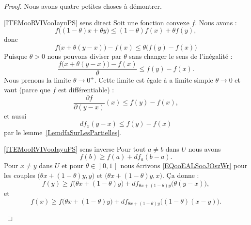 \begin{proof}
    Nous avons quatre petites choses à démontrer.
    \begin{subproof}
    \item[\ref{ITEMooRVIVooIayuPS} sens direct]
        Soit une fonction convexe \( f\). Nous avons :
        \begin{equation}
            f\big( (1-\theta)x+\theta y \big)\leq (1-\theta)f(x)+\theta f(y),
        \end{equation}
        donc
        \begin{equation}
            f\big( x+\theta(y-x) \big)-f(x)\leq \theta\big( f(y)-f(x) \big)
        \end{equation}
        Puisque \( \theta>0\) nous pouvons diviser par \( \theta\) sans changer le sens de l'inégalité :
        \begin{equation}        \label{EQooAXXFooHWtiJh}
            \frac{ f\big( x+\theta(y-x) \big)-f(x) }{ \theta }\leq f(y)-f(x).
        \end{equation}
        Nous prenons la limite \( \theta\to 0^+\). Cette limite est égale à a limite simple \( \theta\to 0\) et vaut (parce que \( f\) est différentiable) :
        \begin{equation}
            \frac{ \partial f }{ \partial (y-x) }(x)\leq f(y)-f(x),
        \end{equation}
        et aussi
        \begin{equation}
            df_x(y-x)\leq f(y)-f(x)
        \end{equation}
        par le lemme~\ref{LemdfaSurLesPartielles}.
    \item[\ref{ITEMooRVIVooIayuPS} sens inverse]
        Pour tout \( a\neq b\) dans \( U\) nous avons
        \begin{equation}        \label{EQooEALSooJOszWr}
            f(b)\geq f(a)+df_a(b-a).
        \end{equation}
        Pour \( x\neq y\) dans \( U\) et pour \( \theta\in\mathopen] 0 , 1 \mathclose[\) nous écrivons \eqref{EQooEALSooJOszWr} pour les couples \( \big( \theta x+(1-\theta)y,y \big)\) et \( \big( \theta x+(1-\theta)y,x \big)\). Ça donne :
        \begin{equation}
            f(y)\geq f\big( \theta x+(1-\theta)y \big)+df_{\theta x+(1-\theta)y}\big( \theta(y-x) \big),
        \end{equation}
        et
        \begin{equation}
            f(x)\geq f\big( \theta x+(1-\theta)y \big)+df_{\theta x+(1-\theta)y}\big( (1-\theta)(x-y) \big).

\end{equation}
\end{subproof}
\end{proof}
